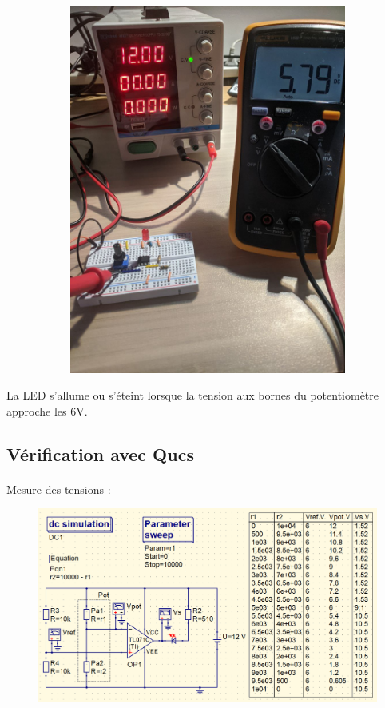 \documentclass{article}
\begin{document}
\begin{figure}[H]
\begin{subfigure}{.4\textwidth}
        \includegraphics[width=.9\linewidth]{./images/labo3-verif2.jpg}
    \end{subfigure}
\end{figure}
La LED s'allume ou s'éteint lorsque la tension aux bornes du potentiomètre approche les 6V.

\subsection{Vérification avec Qucs}
\paragraph{}Mesure des tensions :
\begin{figure}[H]
    \centering
    \includegraphics[width=.95\linewidth]{./images/labo3-qucs.png}
\end{figure}
\end{document}

